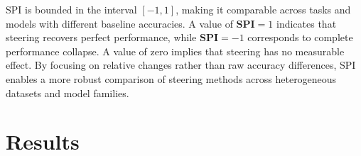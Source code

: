 \documentclass[sigconf]{acmart}
\begin{document}
SPI is bounded in the interval $[-1, 1]$, making it comparable across tasks and models with different baseline accuracies. A value of $\mathbf{SPI} = 1$ indicates that steering recovers perfect performance, while $\mathbf{SPI} = -1$ corresponds to complete performance collapse. A value of zero implies that steering has no measurable effect. By focusing on relative changes rather than raw accuracy differences, SPI enables a more robust comparison of steering methods across heterogeneous datasets and model families.



\section{Results}




\end{document}
